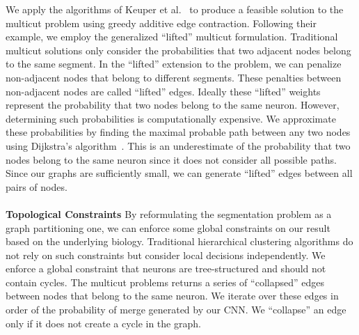 We apply the algorithms of Keuper et al.~\cite{keuper2015efficient} to produce a feasible solution to the multicut problem using greedy additive edge contraction.
Following their example, we employ the generalized ``lifted'' multicut formulation.
Traditional multicut solutions only consider the probabilities that two adjacent nodes belong to the same segment. 
In the ``lifted'' extension to the problem, we can penalize non-adjacent nodes that belong to different segments. 
These penalties between non-adjacent nodes are called ``lifted'' edges. 
Ideally these ``lifted'' weights represent the probability that two nodes belong to the same neuron.
However, determining such probabilities is computationally expensive.
We approximate these probabilities by finding the maximal probable path between any two nodes using Dijkstra's algorithm~\cite{keuper2015efficient}.
This is an underestimate of the probability that two nodes belong to the same neuron since it does not consider all possible paths.
Since our graphs are sufficiently small, we can generate ``lifted'' edges between all pairs of nodes. 
\\~\\
\noindent\textbf{Topological Constraints}
By reformulating the segmentation problem as a graph partitioning one, we can enforce some global constraints on our result based on the underlying biology.
Traditional hierarchical clustering algorithms do not rely on such constraints but consider local decisions independently.
We enforce a global constraint that neurons are tree-structured and should not contain cycles. 
The multicut problems returns a series of ``collapsed'' edges between nodes that belong to the same neuron.
We iterate over these edges in order of the probability of merge generated by our CNN. 
We ``collapse'' an edge only if it does not create a cycle in the graph.
